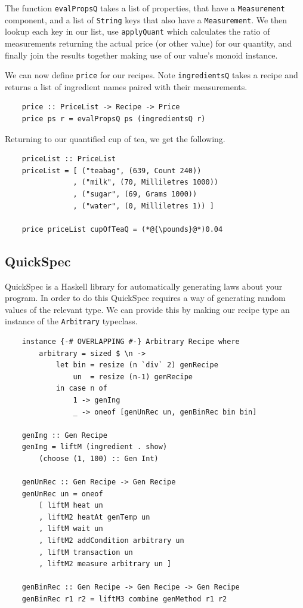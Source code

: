 \documentclass[11pt]{article}
\begin{document}
The function \texttt{evalPropsQ} takes a list of properties, that have a \texttt{Measurement}
component, and a list of \texttt{String} keys that also have a \texttt{Measurement}.
We then lookup each key in our list, use \texttt{applyQuant} which calculates the ratio
of measurements returning the actual price (or other value) for our quantity, and finally
join the results together making use of our value's monoid instance.

\medbreak

We can now define \texttt{price} for our recipes. Note \texttt{ingredientsQ} takes a recipe
and returns a list of ingredient names paired with their measurements.

\begin{lstlisting}
    price :: PriceList -> Recipe -> Price
    price ps r = evalPropsQ ps (ingredientsQ r)
\end{lstlisting}

Returning to our quantified cup of tea, we get the following.

\begin{lstlisting}
    priceList :: PriceList
    priceList = [ ("teabag", (639, Count 240))
                , ("milk", (70, Milliletres 1000))
                , ("sugar", (69, Grams 1000))
                , ("water", (0, Milliletres 1)) ]

    price priceList cupOfTeaQ = (*@{\pounds}@*)0.04
\end{lstlisting}

\subsection{QuickSpec}

QuickSpec \cite{quickspec, quickspec2} is a Haskell library for automatically generating
laws about your program. In order to do this QuickSpec requires a way of generating
random values of the relevant type. We can provide this by making our recipe type
an instance of the \texttt{Arbitrary} typeclass.

\begin{lstlisting}
    instance {-# OVERLAPPING #-} Arbitrary Recipe where
        arbitrary = sized $ \n ->
            let bin = resize (n `div` 2) genRecipe
                un  = resize (n-1) genRecipe
            in case n of
                1 -> genIng
                _ -> oneof [genUnRec un, genBinRec bin bin]

    genIng :: Gen Recipe
    genIng = liftM (ingredient . show)
        (choose (1, 100) :: Gen Int)

    genUnRec :: Gen Recipe -> Gen Recipe
    genUnRec un = oneof
        [ liftM heat un
        , liftM2 heatAt genTemp un
        , liftM wait un
        , liftM2 addCondition arbitrary un
        , liftM transaction un
        , liftM2 measure arbitrary un ]

    genBinRec :: Gen Recipe -> Gen Recipe -> Gen Recipe
    genBinRec r1 r2 = liftM3 combine genMethod r1 r2
\end{lstlisting}
\end{document}
